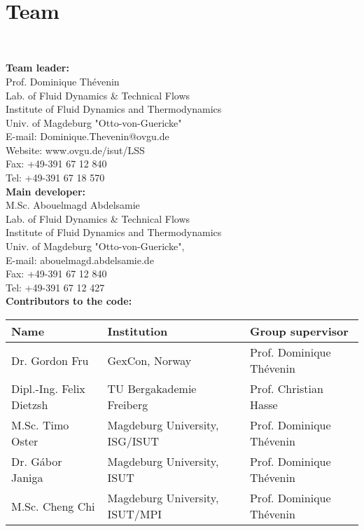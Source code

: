 
\newpage 
\bc 
\section*{Team}  
\ec


\noindent
\textbf{\large{Team leader:}} \\
Prof. Dominique Th\'{e}venin \\
Lab. of Fluid Dynamics \& Technical Flows \\
Institute of Fluid Dynamics and Thermodynamics\\
Univ. of Magdeburg "Otto-von-Guericke"\\
E-mail: Dominique.Thevenin@ovgu.de\\
Website: www.ovgu.de/isut/LSS\\
Fax: +49-391 67 12 840 \\
Tel: +49-391 67 18 570 \\

\noindent
\textbf{\large{Main developer:}} \\
\noindent
M.Sc. Abouelmagd Abdelsamie\\
Lab. of Fluid Dynamics \& Technical Flows\\
Institute of Fluid Dynamics and Thermodynamics\\
Univ. of Magdeburg "Otto-von-Guericke",\\
E-mail: abouelmagd.abdelsamie.de\\
Fax: +49-391 67 12 840 \\
Tel: +49-391 67 12 427 \\




\noindent
\textbf{\large{Contributors to the code:}} \\


\begin{tabular}{l l l}
\hline
\textbf{Name}               &  \textbf{Institution}                  & \textbf{Group supervisor}    \\ 
\hline
Dr. Gordon Fru              & GexCon, Norway                         & Prof. Dominique Th\'{e}venin \\ 
Dipl.-Ing.    Felix Dietzsh & TU Bergakademie Freiberg               & Prof. Christian Hasse        \\
M.Sc. Timo Oster            & Magdeburg University, ISG/ISUT          & Prof. Dominique Th\'{e}venin \\           
Dr. G\'{a}bor Janiga       &Magdeburg University, ISUT            & Prof. Dominique Th\'{e}venin \\
M.Sc. Cheng Chi            & Magdeburg University, ISUT/MPI          & Prof. Dominique Th\'{e}venin \\           
\end{tabular}


